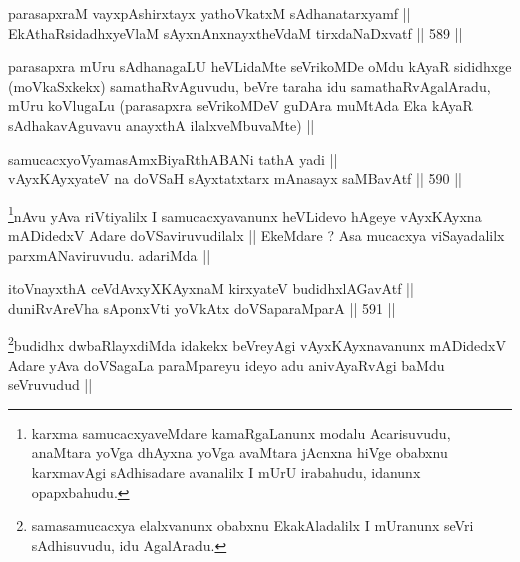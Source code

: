 \begin{shl}
parasapxraM vayxpAshirxtayx yathoVkatxM sAdhanatarxyamf || \\
EkAthaRsidadhxyeV\s laM sAyxnAnxnayxtheVdaM tirxdaNaDxvatf ||  589 ||  
\end{shl}

\begin{artha}
parasapxra mUru sAdhanagaLU heVLidaMte seVrikoMDe oMdu kAyaR sididhxge
(moVkaSxkekx) samathaRvAguvudu, beVre taraha idu samathaRvAgalAradu,
mUru koVlugaLu (parasapxra seVrikoMDeV guDAra muMtAda Eka kAyaR
sAdhakavAguvavu anayxthA ilalxveMbuvaMte)  ||
\end{artha}


\begin{shl}
samucacxyoV\s yamasAmxBiyaRthA\s BANi tathA yadi ||  \\
vAyxKAyxyateV na doVSaH sAyxtatxtarx mAnasayx saMBavAtf ||  590 ||  
\end{shl}

\begin{artha}
\footnote{karxma samucacxyaveMdare kamaRgaLanunx modalu Acarisuvudu,
  anaMtara yoVga dhAyxna yoVga avaMtara jAcnxna hiVge obabxnu
  karxmavAgi sAdhisadare avanalilx I mUrU irabahudu, idanunx opapxbahudu.}nAvu yAva riVtiyalilx I samucacxyavanunx heVLidevo hAgeye
vAyxKAyxna mADidedxV Adare doVSaviruvudilalx || EkeMdare ? Asa
mucacxya viSayadalilx parxmANaviruvudu. adariMda ||
\end{artha}


\begin{shl}
itoV\s nayxthA ceVdAvxyXKAyxnaM kirxyateV budidhxlAGavAtf || \\
duniRvAreVha sA\s \s ponxVti yoVkAtx doVSaparaMparA ||  591 ||  
\end{shl}

\begin{artha}
\footnote{samasamucacxya elalxvanunx obabxnu EkakAladalilx I mUranunx
  seVri sAdhisuvudu, idu AgalAradu.}budidhx dwbaRlayxdiMda idakekx beVreyAgi vAyxKAyxnavanunx
mADidedxV Adare yAva doVSagaLa paraMpareyu ideyo adu anivAyaRvAgi
baMdu seVruvudud ||
\end{artha}



